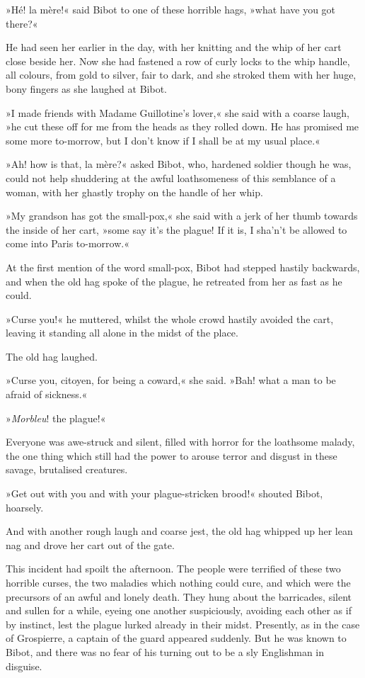 »Hé! la mère!« said Bibot to one of these horrible hags, »what have you got there?«

He had seen her earlier in the day, with her knitting and the whip of her cart close beside her. Now she had fastened a row of curly locks to the whip handle, all colours, from gold to silver, fair to dark, and she stroked them with her huge, bony fingers as she laughed at Bibot.

»I made friends with Madame Guillotine's lover,« she said with a coarse laugh, »he cut these off for me from the heads as they rolled down. He has promised me some more to-morrow, but I don't know if I shall be at my usual place.«

»Ah! how is that, la mère?« asked Bibot, who, hardened soldier though he was, could not help shuddering at the awful loathsomeness of this semblance of a woman, with her ghastly trophy on the handle of her whip.

»My grandson has got the small-pox,« she said with a jerk of her thumb towards the inside of her cart, »some say it's the plague! If it is, I sha'n't be allowed to come into Paris to-morrow.«

At the first mention of the word small-pox, Bibot had stepped hastily backwards, and when the old hag spoke of the plague, he retreated from her as fast as he could.

»Curse you!« he muttered, whilst the whole crowd hastily avoided the cart, leaving it standing all alone in the midst of the place.

The old hag laughed.

»Curse you, citoyen, for being a coward,« she said. »Bah! what a man to be afraid of sickness.«

»\textit{Morbleu}! the plague!«

Everyone was awe-struck and silent, filled with horror for the loathsome malady, the one thing which still had the power to arouse terror and disgust in these savage, brutalised creatures.

»Get out with you and with your plague-stricken brood!« shouted Bibot, hoarsely.

And with another rough laugh and coarse jest, the old hag whipped up her lean nag and drove her cart out of the gate.

This incident had spoilt the afternoon. The people were terrified of these two horrible curses, the two maladies which nothing could cure, and which were the precursors of an awful and lonely death. They hung about the barricades, silent and sullen for a while, eyeing one another suspiciously, avoiding each other as if by instinct, lest the plague lurked already in their midst. Presently, as in the case of Grospierre, a captain of the guard appeared suddenly. But he was known to Bibot, and there was no fear of his turning out to be a sly Englishman in disguise.

